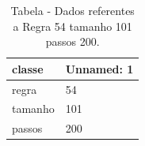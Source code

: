 \begin{table}[H]
\centering
\caption{Tabela - Dados referentes a Regra 54 tamanho 101 passos 200.}
\label{tab:regra_54_tamanho_101_passos_200}
\begin{tabular}{ll}
\toprule
classe & Unnamed: 1 \\
\midrule
regra & 54 \\
tamanho & 101 \\
passos & 200 \\
\bottomrule
\end{tabular}

\end{table}
